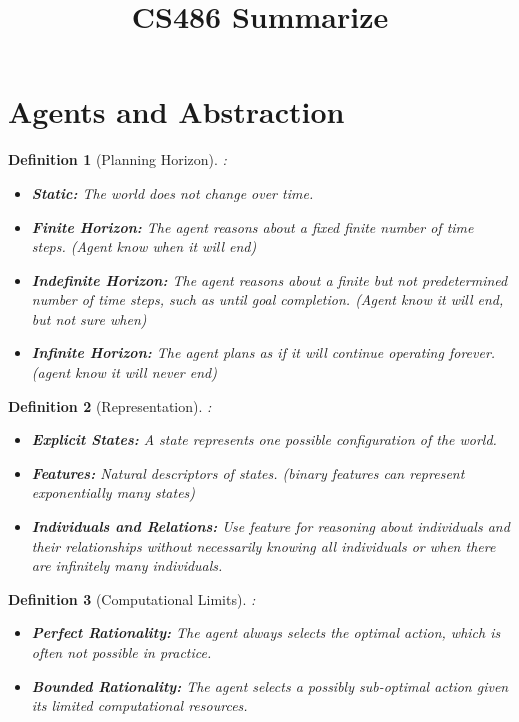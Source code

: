 \documentclass{article}
\title{CS486 Summarize}
\author{}
\date{}
\theoremstyle{note}
\newtheorem{definition}{Definition}[section]
\begin{document}
\section{Agents and Abstraction}

\begin{definition}[Planning Horizon]:
\begin{itemize}
    \item \textbf{Static:} The world does not change over time.
    \item \textbf{Finite Horizon:} The agent reasons about a fixed finite number of time steps.
     (Agent know when it will end)
    \item \textbf{Indefinite Horizon:} The agent reasons about a finite but not predetermined number of time steps, such as until goal completion.
    (Agent know it will end, but not sure when)
    \item \textbf{Infinite Horizon:} The agent plans as if it will continue operating forever.
    (agent know it will never end)
\end{itemize}
\end{definition}

\begin{definition}[Representation]:
\begin{itemize}
    \item \textbf{Explicit States:} A state represents one possible configuration of the world.
    \item \textbf{Features:} Natural descriptors of states. (binary features can represent exponentially many states)
    \item \textbf{Individuals and Relations:} Use feature for reasoning about individuals and their relationships without necessarily knowing all individuals or when there are infinitely many individuals.
\end{itemize}
\end{definition}

\begin{definition}[Computational Limits]:
\begin{itemize}
    \item \textbf{Perfect Rationality:} The agent always selects the optimal action, which is often not possible in practice.
    \item \textbf{Bounded Rationality:} The agent selects a possibly sub-optimal action given its limited computational resources.
\end{itemize}
\end{definition}
\end{document}
